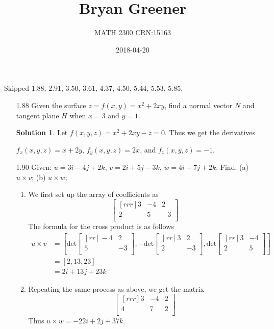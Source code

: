 \documentclass[12pt]{article}
\title{Bryan Greener}
\author{MATH 2300 CRN:15163}
\date{2018-04-20}
\theoremstyle{plain}
\theoremstyle{definition}
\newtheorem*{solution}{Solution} %
\theoremstyle{plain}
\begin{document}
\maketitle

\TabPositions{4cm}
Skipped 1.88, 2.91, 3.50, 3.61, 4.37, 4.50, 5.44, 5.53, 5.85, 



\begin{enumerate}
\item[1.88]Given the surface $z=f(x,y)=x^2+2xy$, find a normal vector $N$ and tangent plane $H$ when $x=3$ and $y=1$.
	\begin{solution}
	Let $f(x,y,z) = x^2+2xy-z = 0$. Thus we get the derivatives 
	\begin{center}
	$f_x(x,y,z)=x+2y$, $f_y(x,y,z)=2x$, and $f_z(x,y,z)=-1$.
	\end{center}
	\end{solution}
	
\item[1.90]Given: $u=3i-4j+2k$, $v=2i+5j-3k$, $w=4i+7j+2k$. Find: (a) $u \times v$; (b) $u \times w$;
	\begin{enumerate}
	\item We first set up the array of coefficients as
		\[ \begin{bmatrix}[rrr]3&-4&2\\2&5&-3\\\end{bmatrix} \]
		The formula for the cross product is as follows
		\begin{align*}
		u \times v &= \left[ \mathrm{det}\begin{bmatrix}[rr]-4&2\\5&-3\\\end{bmatrix},-\mathrm{det}\begin{bmatrix}[rr]3&2\\2&-3\\\end{bmatrix},\mathrm{det}\begin{bmatrix}[rr]3&-4\\2&5\\\end{bmatrix}\right]\\
		&= [ 2, 13, 23 ]\\
		&= 2i+13j+23k 
		\end{align*}
	\item Repeating the same process as above, we get the matrix
		\[ \begin{bmatrix}[rrr]3&-4&2\\4&7&2\\\end{bmatrix} \]
		Thus $u\times w =-22i+2j+37k$. 
	\end{enumerate}
	

\end{enumerate}
\end{document}
